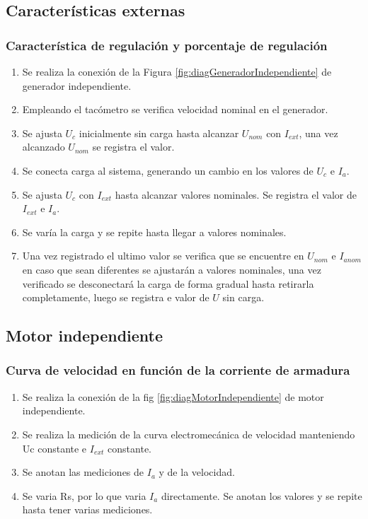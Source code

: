 \documentclass[11pt,letterpaper]{article}     %
\begin{document}
\subsection{Características externas}
\subsubsection{Característica de regulación y porcentaje de regulación}
\begin{enumerate}
    \item Se realiza la conexión de la Figura \ref{fig:diagGeneradorIndependiente} de generador independiente.
    \item Empleando el tacómetro se verifica velocidad nominal en el generador.
    \item Se ajusta $U_{c}$ inicialmente sin carga hasta alcanzar $U_{nom}$ con $I_{ext}$, una vez alcanzado $U_{nom}$ se registra el valor.
    \item Se conecta carga al sistema, generando un cambio en los valores de $U_{c}$ e $I_a$.
    \item Se ajusta $U_{c}$ con $I_{ext}$ hasta alcanzar valores nominales. Se registra el valor de $I_{ext}$ e $I_a$.
    \item Se varía la carga y se repite hasta llegar a valores nominales.
    \item Una vez registrado el ultimo valor se verifica que se encuentre en $U_{nom}$ e $I_{anom}$ en caso que sean diferentes se ajustarán a valores nominales, una vez verificado se desconectará la carga de forma gradual hasta retirarla completamente, luego se registra e valor de $U$ sin carga. 
\end{enumerate}
\subsection{Motor independiente}
\subsubsection{Curva de velocidad en función de la corriente de armadura}
\begin{enumerate}
    \item Se realiza la conexión de la fig \ref{fig:diagMotorIndependiente} de motor independiente.
    \item Se realiza la medición de la curva electromecánica de velocidad manteniendo Uc constante e $I_{ext}$ constante.
    \item Se anotan las mediciones de $I_a$ y de la velocidad.
    \item Se varia Rs, por lo que varia $I_a$ directamente. Se anotan los valores y se repite hasta tener varias mediciones.
\end{enumerate}
\end{document}
